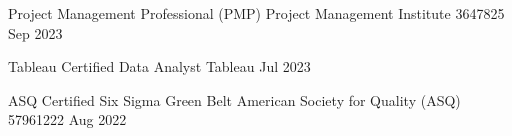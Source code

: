 

\begin{cvhonors}

  \cvhonor
    {Project Management Professional (PMP)} %
    {Project Management Institute} %
    {3647825} %
    {Sep 2023} %

  \cvhonor
    {Tableau Certified Data Analyst} %
    {Tableau} %
    {} %
    {Jul 2023} %

  \cvhonor
    {ASQ Certified Six Sigma Green Belt } %
    {American Society for Quality (ASQ)} %
    {57961222} %
    {Aug 2022} %

\end{cvhonors}